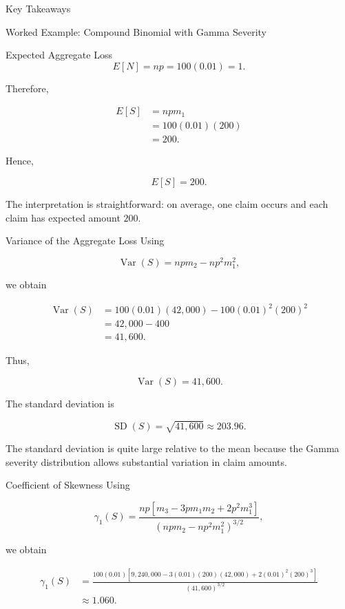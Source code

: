 \documentclass[
  ignorenonframetext,
  aspectratio=169,
]{beamer}
\begin{document}
\begin{frame}{Key Takeaways}
\begin{block}{Worked Example: Compound Binomial with Gamma Severity}
\begin{block}{Expected Aggregate Loss}
\[
E[N]=np=100(0.01)=1.
\]

Therefore,

\[
\begin{aligned}
E[S]
&=npm_1\\
&=100(0.01)(200)\\
&=200.
\end{aligned}
\]

Hence,

\[
\boxed{
E[S]=200.
}
\]

The interpretation is straightforward: on average, one claim occurs and
each claim has expected amount \(200\).
\end{block}

\begin{block}{Variance of the Aggregate Loss}
\protect{}\label{variance-of-the-aggregate-loss}
Using

\[
\operatorname{Var}(S)
=
npm_2-np^2m_1^2,
\]

we obtain

\[
\begin{aligned}
\operatorname{Var}(S)
&=
100(0.01)(42{,}000)
-
100(0.01)^2(200)^2\\
&=
42{,}000-400\\
&=
41{,}600.
\end{aligned}
\]

Thus,

\[
\boxed{
\operatorname{Var}(S)=41{,}600.
}
\]

The standard deviation is

\[
\operatorname{SD}(S)
=
\sqrt{41{,}600}
\approx203.96.
\]

The standard deviation is quite large relative to the mean because the
Gamma severity distribution allows substantial variation in claim
amounts.
\end{block}

\begin{block}{Coefficient of Skewness}
\protect{}\label{coefficient-of-skewness}
Using

\[
\gamma_1(S)
=
\frac{
np\left[
m_3-3pm_1m_2+2p^2m_1^3
\right]
}{
\left(
npm_2-np^2m_1^2
\right)^{3/2}
},
\]

we obtain

\[
\begin{aligned}
\gamma_1(S)
&=
\frac{
100(0.01)
\left[
9{,}240{,}000
-3(0.01)(200)(42{,}000)
+2(0.01)^2(200)^3
\right]
}{
(41{,}600)^{3/2}
}\\
&\approx1.060.
\end{aligned}
\]


\end{block}
\end{block}
\end{frame}
\end{document}
